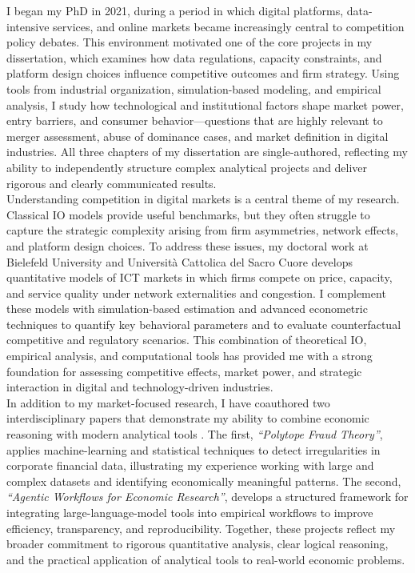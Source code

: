 \documentclass{nfr}
\begin{document}
I began my PhD in 2021, during a period in which digital platforms, data-intensive services, and online markets became increasingly central to competition policy debates. 
This environment motivated one of the core projects in my dissertation, which examines how data regulations, capacity constraints, and platform design choices influence competitive outcomes and firm strategy. 
Using tools from industrial organization, simulation-based modeling, and empirical analysis, I study how technological and institutional factors shape market power, entry barriers, and consumer behavior—questions that are highly relevant to merger assessment, abuse of dominance cases, and market definition in digital industries. 
All three chapters of my dissertation are single-authored, reflecting my ability to independently structure complex analytical projects and deliver rigorous and clearly communicated results.\\

Understanding competition in digital markets is a central theme of my research. 
Classical IO models provide useful benchmarks, but they often struggle to capture the strategic complexity arising from firm asymmetries, network effects, and platform design choices. 
To address these issues, my doctoral work at Bielefeld University and Università Cattolica del Sacro Cuore develops quantitative models of ICT markets in which firms compete on price, capacity, and service quality under network externalities and congestion. 
I complement these models with simulation-based estimation and advanced econometric techniques to quantify key behavioral parameters and to evaluate counterfactual competitive and regulatory scenarios. 
This combination of theoretical IO, empirical analysis, and computational tools has provided me with a strong foundation for assessing competitive effects, market power, and strategic interaction in digital and technology-driven industries.\\

In addition to my market-focused research, I have coauthored two interdisciplinary papers that demonstrate my ability to combine economic reasoning with modern analytical tools \citep{Zhao2025, Dawid2025}. 
The first, \textit{“Polytope Fraud Theory”}, applies machine-learning and statistical techniques to detect irregularities in corporate financial data, illustrating my experience working with large and complex datasets and identifying economically meaningful patterns. 
The second, \textit{“Agentic Workflows for Economic Research”}, develops a structured framework for integrating large-language-model tools into empirical workflows to improve efficiency, transparency, and reproducibility. 
Together, these projects reflect my broader commitment to rigorous quantitative analysis, clear logical reasoning, and the practical application of analytical tools to real-world economic problems.\\
\end{document}
